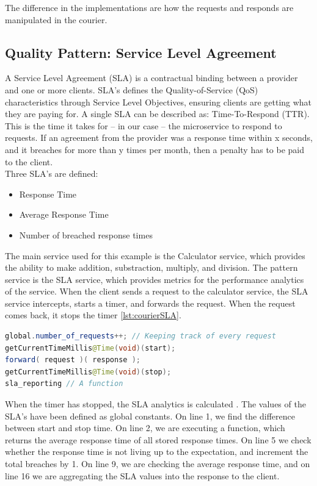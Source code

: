 \documentclass[12pt]{article}
\begin{document}
The difference in the implementations are how the requests and responds are manipulated in the courier.

\subsection{Quality Pattern: Service Level Agreement}
A Service Level Agreement (SLA) \cite{SLA} is a contractual binding between a provider and one or more clients. SLA's defines the Quality-of-Service (QoS) \cite{QoS} characteristics through Service Level Objectives, ensuring clients are getting what they are paying for. A single SLA can be described as: Time-To-Respond (TTR). This is the time it takes for -- in our case -- the microservice to respond to requests. If an agreement from the provider was a response time within x seconds, and it breaches for more than y times per month, then a penalty has to be paid to the client. \\

Three SLA's are defined:
\begin{itemize}
    \item Response Time
    \item Average Response Time
    \item Number of breached response times
\end{itemize}

The main service used for this example is the Calculator service, which provides the ability to make addition, substraction, multiply, and division. The pattern service is the SLA service, which provides metrics for the performance analytics of the service. When the client sends a request to the calculator service, the SLA service intercepts, starts a timer, and forwards the request. When the request comes back, it stops the timer \ref{lst:courierSLA}. 

\begin{lstlisting}[caption=Courier operations for the SLA service, 
captionpos=b, language=java, label=courierSLA, frame=single]
global.number_of_requests++; // Keeping track of every request
getCurrentTimeMillis@Time(void)(start);
forward( request )( response );
getCurrentTimeMillis@Time(void)(stop);
sla_reporting // A function
\end{lstlisting}

When the timer has stopped, the SLA analytics is calculated \cite{lst:slaOperation}. The values of the SLA's have been defined as global constants. On line 1, we find the difference between start and stop time. On line 2, we are executing a function, which returns the average response time of all stored response times. On line 5 we check whether the response time is not living up to the expectation, and increment the total breaches by 1. On line 9, we are checking the average response time, and on line 16 we are aggregating the SLA values into the response to the client. 
\end{document}
